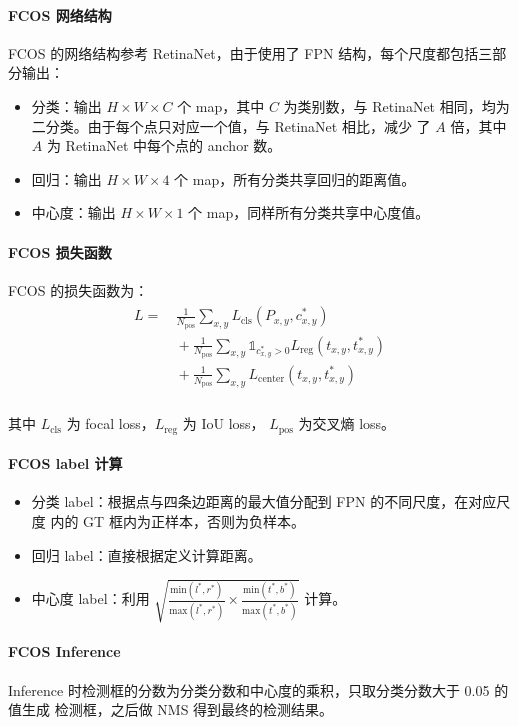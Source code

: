 \paragraph{FCOS 网络结构}
FCOS 的网络结构参考 RetinaNet，由于使用了 FPN 结构，每个尺度都包括三部分输出：
\begin{itemize}
  \item 分类：输出 $H \times W \times C$ 个 map，其中 $C$ 为类别数，与
    RetinaNet 相同，均为二分类。由于每个点只对应一个值，与 RetinaNet 相比，减少
    了 $A$ 倍，其中 $A$ 为 RetinaNet 中每个点的 anchor 数。
  \item 回归：输出 $H \times W \times 4$ 个 map，所有分类共享回归的距离值。
  \item 中心度：输出 $H \times W \times 1$ 个 map，同样所有分类共享中心度值。
\end{itemize}

\paragraph{FCOS 损失函数}
FCOS 的损失函数为：
\begin{align}
  \label{equ:fcos-loss}
  \begin{split}
    L = & \, \frac{1}{N_{\mathrm{pos}}} \sum_{x, y} L_{\mathrm{cls}} (P_{x,y}, c_{x,y}^*) \\
    & \, + \frac{1}{N_{\mathrm{pos}}} \sum_{x, y} \mathds{1}_{c_{x,y}^* > 0}L_{\mathrm{reg}}(t_{x,y}, t_{x,y}^*) \\
    & \, + \frac{1}{N_{\mathrm{pos}}} \sum_{x, y} L_{\mathrm{center}}(t_{x,y}, t_{x,y}^*) \\
  \end{split}
\end{align}

其中 $L_{\mathrm{cls}}$ 为 focal loss，$L_{\mathrm{reg}}$ 为 IoU loss\cite{2016-IoU-loss}，
$L_{\mathrm{pos}}$ 为交叉熵 loss。

\paragraph{FCOS label 计算}
\begin{itemize}
  \item 分类 label：根据点与四条边距离的最大值分配到 FPN 的不同尺度，在对应尺度
    内的 GT 框内为正样本，否则为负样本。
  \item 回归 label：直接根据定义计算距离。
  \item 中心度 label：利用 $\sqrt{\frac{\mathrm{min}(l^*,
        r^*)}{\mathrm{max}(l^*, r^*)} \times \frac{\mathrm{min}(t^*,
        b^*)}{\mathrm{max}(t^*, b^*)}}$ 计算。
\end{itemize}

\paragraph{FCOS Inference}
Inference 时检测框的分数为分类分数和中心度的乘积，只取分类分数大于 0.05 的值生成
检测框，之后做 NMS 得到最终的检测结果。

